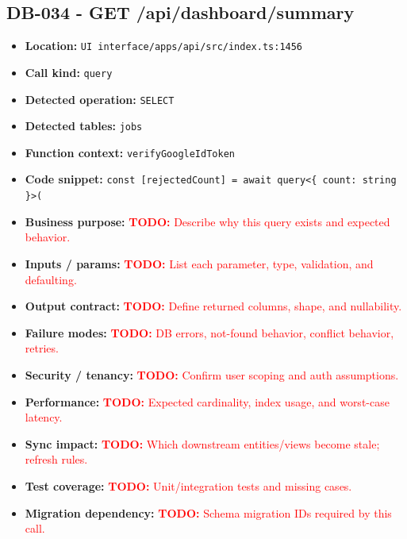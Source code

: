 \documentclass[11pt]{article}
\newcommand{\todoitem}[1]{\textcolor{red}{\textbf{TODO:} #1}}
\begin{document}
\subsection{DB-034 - GET /api/dashboard/summary}
\begin{itemize}[leftmargin=1.5em]
\item \textbf{Location:} \texttt{UI interface/apps/api/src/index.ts:1456}
\item \textbf{Call kind:} \texttt{query}
\item \textbf{Detected operation:} \texttt{SELECT}
\item \textbf{Detected tables:} \texttt{jobs}
\item \textbf{Function context:} \texttt{verifyGoogleIdToken}
\item \textbf{Code snippet:} \texttt{const [rejectedCount] = await query<\{ count: string \}>(}
\item \textbf{Business purpose:} \todoitem{Describe why this query exists and expected behavior.}
\item \textbf{Inputs / params:} \todoitem{List each parameter, type, validation, and defaulting.}
\item \textbf{Output contract:} \todoitem{Define returned columns, shape, and nullability.}
\item \textbf{Failure modes:} \todoitem{DB errors, not-found behavior, conflict behavior, retries.}
\item \textbf{Security / tenancy:} \todoitem{Confirm user scoping and auth assumptions.}
\item \textbf{Performance:} \todoitem{Expected cardinality, index usage, and worst-case latency.}
\item \textbf{Sync impact:} \todoitem{Which downstream entities/views become stale; refresh rules.}
\item \textbf{Test coverage:} \todoitem{Unit/integration tests and missing cases.}
\item \textbf{Migration dependency:} \todoitem{Schema migration IDs required by this call.}
\end{itemize}
\end{document}
